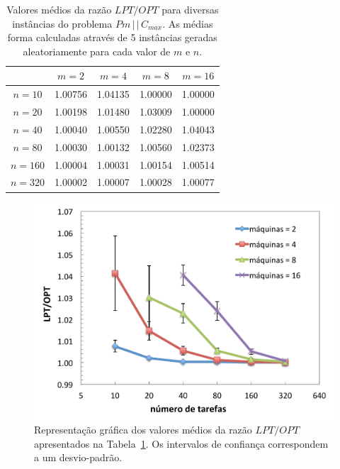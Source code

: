 \documentclass[12pt,a4paper]{article}
\begin{document}
\begin{table}[htbp]
  \begin{center}
    \begin{tabular}{|c|c|c|c|c|}
      \hline 
                & $m = 2$ & $m = 4$ & $m = 8$ & $m = 16$ \\
      \hline \hline 
      $n = 10$  & 1.00756 & 1.04135 & 1.00000 & 1.00000 \\ \hline
      $n = 20$  & 1.00198 & 1.01480 & 1.03009 & 1.00000 \\ \hline
      $n = 40$  & 1.00040 & 1.00550 & 1.02280 & 1.04043 \\ \hline
      $n = 80$  & 1.00030 & 1.00132 & 1.00560 & 1.02373 \\ \hline
      $n = 160$ & 1.00004 & 1.00031 & 1.00154 & 1.00514 \\ \hline
      $n = 320$ & 1.00002 & 1.00007 & 1.00028 & 1.00077 \\ \hline
      \end{tabular} 
      \caption{Valores médios da razão $LPT/OPT$ para diversas instâncias do problema 
      $Pm\,|\,|\,C_{max}$. As médias forma calculadas através de 5 instâncias
      geradas aleatoriamente para cada valor de $m$ e $n$.}
      \label{tab:medidas}
  \end{center}
\end{table}

\begin{figure}[htbp]
 \label{fig:medidas}
 \begin{center}
   \includegraphics[scale=0.70]{../resultados/medidas.pdf}
   \caption{Representação gráfica dos valores médios da razão $LPT/OPT$ apresentados na 
   Tabela~\ref{tab:medidas}. Os intervalos de confiança correspondem a um desvio-padrão.}
 \end{center}
\end{figure}
\end{document}
